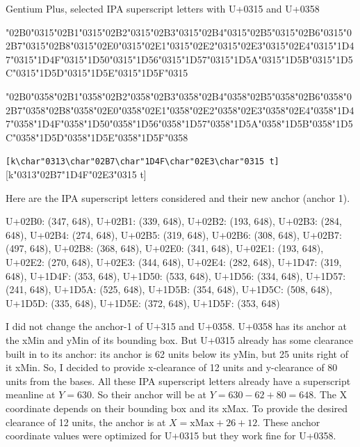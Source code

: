 \documentclass[landscape]{article}
\newcommand{\gs}{\hspace{0.5mm}}	%
\begin{document}
Gentium Plus, selected IPA superscript letters with U+0315 and U+0358

{\Gentium
	\char"02B0\char"0315\gs \char"02B1\char"0315\gs \char"02B2\char"0315\gs \char"02B3\char"0315\gs \char"02B4\char"0315\gs \char"02B5\char"0315\gs \char"02B6\char"0315\gs \char"02B7\char"0315\gs \char"02B8\char"0315\gs \char"02E0\char"0315\gs \char"02E1\char"0315\gs \char"02E2\char"0315\gs \char"02E3\char"0315\gs \char"02E4\char"0315\gs \char"1D47\char"0315\gs \char"1D4F\char"0315\gs \char"1D50\char"0315\gs \char"1D56\char"0315\gs \char"1D57\char"0315\gs \char"1D5A\char"0315\gs \char"1D5B\char"0315\gs \char"1D5C\char"0315\gs \char"1D5D\char"0315\gs \char"1D5E\char"0315\gs \char"1D5F\char"0315
	
	\char"02B0\char"0358\gs \char"02B1\char"0358\gs \char"02B2\char"0358\gs \char"02B3\char"0358\gs \char"02B4\char"0358\gs \char"02B5\char"0358\gs \char"02B6\char"0358\gs \char"02B7\char"0358\gs \char"02B8\char"0358\gs \char"02E0\char"0358\gs \char"02E1\char"0358\gs \char"02E2\char"0358\gs \char"02E3\char"0358\gs \char"02E4\char"0358\gs \char"1D47\char"0358\gs \char"1D4F\char"0358\gs \char"1D50\char"0358\gs \char"1D56\char"0358\gs \char"1D57\char"0358\gs \char"1D5A\char"0358\gs \char"1D5B\char"0358\gs \char"1D5C\char"0358\gs \char"1D5D\char"0358\gs \char"1D5E\char"0358\gs \char"1D5F\char"0358

\verb|[k\char"0313\char"02B7\char"1D4F\char"02E3\char"0315 t]|
[k\char"0313\char"02B7\char"1D4F\char"02E3\char"0315 t]
}

Here are the IPA superscript letters considered and their new anchor (anchor 1).

U+02B0: (347, 648),
U+02B1: (339, 648),
U+02B2: (193, 648),
U+02B3: (284, 648),
U+02B4: (274, 648),
U+02B5: (319, 648),
U+02B6: (308, 648),
U+02B7: (497, 648),
U+02B8: (368, 648),
U+02E0: (341, 648),
U+02E1: (193, 648),
U+02E2: (270, 648),
U+02E3: (344, 648),
U+02E4: (282, 648),
U+1D47: (319, 648),
U+1D4F: (353, 648),
U+1D50: (533, 648),
U+1D56: (334, 648),
U+1D57: (241, 648),
U+1D5A: (525, 648),
U+1D5B: (354, 648),
U+1D5C: (508, 648),
U+1D5D: (335, 648),
U+1D5E: (372, 648),
U+1D5F: (353, 648)

I did not change the anchor-1 of U+315 and U+0358.
U+0358 has its anchor at the xMin and yMin of its bounding box.
But U+0315 already has some clearance built in to its anchor: its anchor is 62 units below its yMin, but 25 units right of it xMin.
So, I decided to provide x-clearance of 12 units and y-clearance of 80 units from the bases.
All these IPA superscript letters already have a superscript meanline at $Y = 630$. 
So their anchor will be at $Y = 630 - 62 + 80 = 648$.
The X coordinate depends on their bounding box and its xMax.
To provide the desired clearance of 12 units, the anchor is at $X = \mathrm{xMax} + 26 + 12$.
These anchor coordinate values were optimized for U+0315 but they work fine for U+0358.
\end{document}
